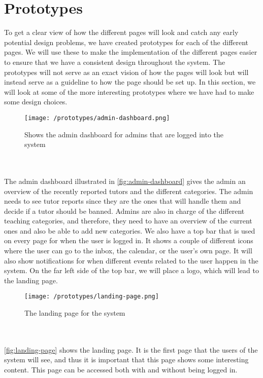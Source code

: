 \section{Prototypes}\label{sec:prototypes-design}
To get a clear view of how the different pages will look and catch any early potential design problems, we have created prototypes for each of the different pages. 
We will use these to make the implementation of the different pages easier to ensure that we have a consistent design throughout the system. 
The prototypes will not serve as an exact vision of how the pages will look but will instead serve as a guideline to how the page should be set up.
In this section, we will look at some of the more interesting prototypes where we have had to make some design choices.
\begin{figure}[]
    \texttt{[image: /prototypes/admin-dashboard.png]}
     \caption{Shows the admin dashboard for admins that are logged into the system}
     \label{fig:admin-dashboard}
 \end{figure}
 \noindent
 \\\\
The admin dashboard illustrated in \autoref{fig:admin-dashboard} gives the admin an overview of the recently reported tutors and the different categories. 
The admin needs to see tutor reports since they are the ones that will handle them and decide if a tutor should be banned. 
Admins are also in charge of the different teaching categories, and therefore, they need to have an overview of the current ones and also be able to add new categories.
We also have a top bar that is used on every page for when the user is logged in. It shows a couple of different icons where the user can go to the inbox, the calendar, or the user's own page. 
It will also show notifications for when different events related to the user happen in the system. 
On the far left side of the top bar, we will place a logo, which will lead to the landing page.
\begin{figure}[]
    \centering
   \texttt{[image: /prototypes/landing-page.png]}
    \caption{The landing page for the system}
    \label{fig:landing-page}
\end{figure}
\noindent
\\\\
\autoref{fig:landing-page} shows the landing page.
It is the first page that the users of the system will see, and thus it is important that this page shows some interesting content. 
This page can be accessed both with and without being logged in. 
